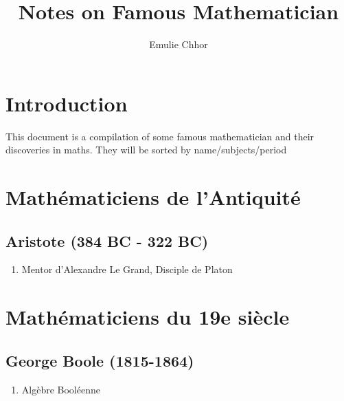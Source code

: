 \documentclass{article}
\begin{document}
\title{Notes on Famous Mathematician}
\author{Emulie Chhor}
\maketitle

\section*{Introduction}

This document is a compilation of some famous mathematician and their
discoveries in maths. They will be sorted by name/subjects/period

\newtheorem{definition}{Definition}[subsection]
\newtheorem{theorem}{Theorem}[subsection]
\newtheorem{corollary}{Corollary}[subsection]
\newtheorem{lemma}[theorem]{Lemma}
\newtheorem{proposition}{Proposition}[section]
\newtheorem{axiom}{Axiome}
\newtheorem{property}{Propriété}[subsection]
\newtheorem*{remark}{Remarque}
\newtheorem*{problem}{Problème}
\newtheorem*{intuition}{Intuition}

\section{Mathématiciens de l'Antiquité}

\subsection{Aristote (384 BC - 322 BC)}

\begin{enumerate}
    \item Mentor d'Alexandre Le Grand, Disciple de Platon
\end{enumerate}

\section{Mathématiciens du 19e siècle}

\subsection{George Boole (1815-1864)}

\begin{enumerate}
    \item Algèbre Booléenne
\end{enumerate}
\end{document}
